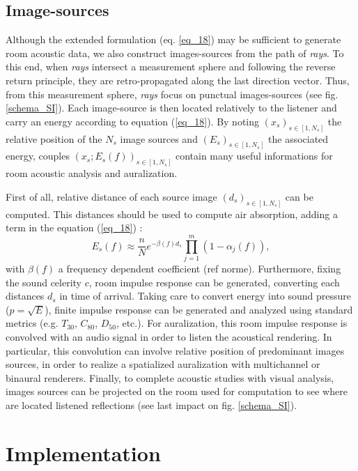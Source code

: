 \documentclass[AMA,STIX1COL]{WileyNJD-v2}
\begin{document}
\subsection{Image-sources}
\label{is}
Although the extended formulation (eq. \ref{eq_18}) may be sufficient to generate room acoustic data, we also construct images-sources from the path of \textit{rays}. To this end, when \textit{rays} intersect a measurement sphere and following the reverse return principle, they are retro-propagated along the last direction vector. Thus, from this measurement sphere, \textit{rays} focus on punctual images-sources (see fig. \ref{schema_SI}). Each image-source is then located relatively to the listener and carry an energy according to equation (\ref{eq_18}). By noting $(x_s)_{s \in [1, N_s]}$ the relative position of the $N_s$ image sources and $(E_s)_{s \in [1, N_s]}$ the associated energy, couples $(x_s;E_s(f))_{s \in [1, N_s]}$ contain many useful informations for room acoustic analysis and auralization. 

First of all, relative distance of each source image $(d_s)_{s \in [1, N_s]}$ can be computed. This distances should be used to compute air absorption, adding a term in the equation (\ref{eq_18}) :
\begin{equation}
E_s(f) \approx  \frac{n}{N}  e^{-\beta(f) d_s}  \prod_{j=1}^{m}(1 - \alpha_j(f)),
\label{eq_19}
\end{equation}    
with $\beta(f)$ a frequency dependent coefficient (ref norme). Furthermore, fixing the sound celerity $c$, room impulse response can be generated, converting each distances $d_s$ in time of arrival. Taking care to convert energy into sound pressure ($p = \sqrt{E}$), finite impulse response can be generated and analyzed using standard metrics (e.g. $T_{30}$, $C_{80}$, $D_{50}$, etc.). For auralization, this room impulse response is convolved with an audio signal in order to listen the acoustical rendering. In particular, this convolution can involve relative position of predominant images sources, in order to realize a spatialized auralization with multichannel or binaural renderers. Finally, to complete acoustic studies with visual analysis, images sources can be projected on the room used for computation to see where are located listened reflections (see last impact on fig. \ref{schema_SI}).



\section{Implementation}
\end{document}
